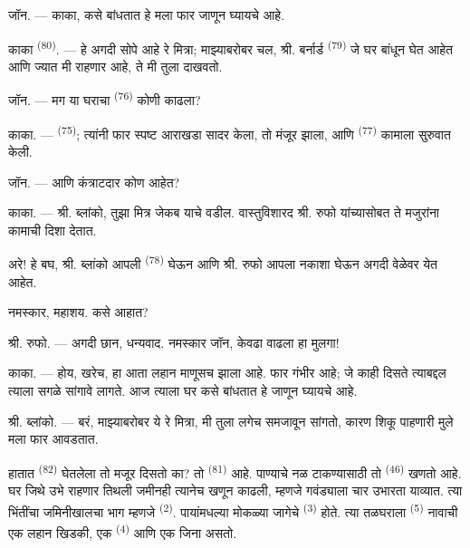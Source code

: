 \VUsaut{6.0mm}
\VUsaut{1.4mm}
\VUsaut{2.2mm}

\VUsaut{3.0mm}

\textsc{जॉन}. --- काका,  कसे बांधतात हे मला फार जाणून घ्यायचे आहे.

\textsc{काका} \textsuperscript{(80)}. --- हे अगदी सोपे आहे रे मित्रा; माझ्याबरोबर चल, श्री.
बर्नार्ड \textsuperscript{(79)} जे घर बांधून घेत आहेत आणि ज्यात मी राहणार आहे, ते मी तुला
दाखवतो.

\textsc{जॉन}. --- मग या घराचा  \textsuperscript{(76)} कोणी काढला?

\textsc{काका}. ---  \textsuperscript{(75)}; त्यांनी फार स्पष्ट आराखडा
सादर केला, तो मंजूर झाला, आणि  \textsuperscript{(77)} कामाला सुरुवात
केली.

\textsc{जॉन}. --- आणि कंत्राटदार कोण आहेत?

\textsc{काका}. --- श्री. ब्लांको, तुझा मित्र जेकब याचे वडील. वास्तुविशारद श्री. रुफो
यांच्यासोबत ते मजुरांना कामाची दिशा देतात.

अरे! हे बघ, श्री. ब्लांको आपली  \textsuperscript{(78)} घेऊन आणि श्री. रुफो
आपला नकाशा घेऊन अगदी वेळेवर येत आहेत.

नमस्कार, महाशय. कसे आहात?

\textsc{श्री. रुफो}. --- अगदी छान, धन्यवाद. नमस्कार जॉन, केवढा वाढला हा मुलगा!

\textsc{काका}. --- होय, खरेच, हा आता लहान माणूसच झाला आहे. फार गंभीर आहे; जे काही दिसते
त्याबद्दल त्याला सगळे सांगावे लागते. आज त्याला घर कसे बांधतात हे जाणून घ्यायचे आहे.

\VUsaut{3.0mm}

\textsc{श्री. ब्लांको}. --- बरं, माझ्याबरोबर ये रे मित्रा, मी तुला लगेच समजावून सांगतो, कारण
शिकू पाहणारी मुले मला फार आवडतात.

हातात  \textsuperscript{(82)} घेतलेला तो मजूर दिसतो का? तो
 \textsuperscript{(81)} आहे. पाण्याचे नळ टाकण्यासाठी तो 
\textsuperscript{(46)} खणतो आहे. घर जिथे उभे राहणार तिथली जमीनही त्यानेच खणून काढली, म्हणजे
गवंड्याला चार  उभारता याव्यात. त्या भिंतींचा जमिनीखालचा भाग म्हणजे 
\textsuperscript{(2)}. पायांमधल्या मोकळ्या जागेचे  \textsuperscript{(3)} होते.
त्या तळघराला  \textsuperscript{(5)} नावाची एक लहान खिडकी, एक 
\textsuperscript{(4)} आणि एक जिना असतो.

